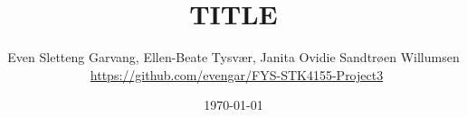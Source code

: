 \documentclass[reprint,english,notitlepage,nofootinbib]{revtex4-1}  %
\begin{document}

\title{TITLE}
\author{Even Sletteng Garvang, Ellen-Beate Tysvær, Janita Ovidie Sandtrøen Willumsen \\ \faGithub \, \url{https://github.com/evengar/FYS-STK4155-Project3}}        
\date{\today}
\noaffiliation


\maketitle





\newpage

 

\onecolumngrid
\newpage 
\printbibliography

\newpage
\twocolumngrid



\end{document}
